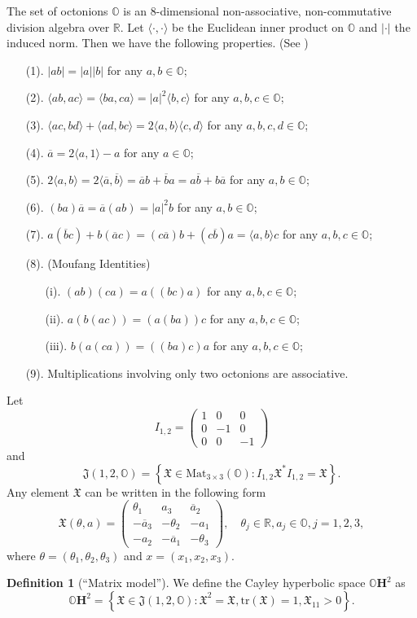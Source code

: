 \documentclass{article}
\newcommand{\OO}{\mathbb{O}}
\newcommand{\RR}{\mathbb{R}}
\newcommand{\tr}{\mathrm{tr}}
\newcommand{\FFJ}{\mathfrak{J}}
\newcommand{\FFX}{\mathfrak{X}}
\newcommand{\matiii}[3]{\left(\begin{array}{ccc} #1\\#2\\#3\end{array}\right)}
\theoremstyle{definition}
\newtheorem{dfn}[thm]{Definition}
\begin{document}
The set of octonions $\OO$ is an $8$-dimensional non-associative, non-commutative division algebra over $\RR$. Let $\langle\cdot,\cdot\rangle$ be the Euclidean inner product on $\OO$ and $|\cdot|$ the induced norm. Then we have the following properties. (See \cite{Springer00})
\begin{enumerate}
\item[(1).] $|ab|=|a||b|$ for any $a,b\in\OO$;
\item[(2).] $\langle ab,ac\rangle=\langle ba,ca\rangle=|a|^2\langle b,c\rangle$ for any $a,b,c\in \OO$;
\item[(3).] $\langle ac,bd\rangle+\langle ad,bc\rangle=2\langle a,b\rangle \langle c,d\rangle$ for any $a,b,c,d\in\OO$;
\item[(4).] $\overline{a}=2\langle a,1\rangle-a$ for any $a\in \OO$;
\item[(5).] $2\langle a,b\rangle=2\langle \overline{a},\overline{b}\rangle=\overline{a}b+\overline{b}a=a\overline{b}+b\overline{a}$ for any $a,b\in\OO$;
\item[(6).] $(ba)\overline{a}=\overline{a}(ab)=|a|^2b$ for any $a,b\in \OO$;
\item[(7).] $a(\overline{b}c)+b(\overline{a}c)=(c\overline{a})b+(c\overline{b})a=\langle a,b\rangle c$ for any $a,b,c\in\OO$;
\item[(8).] (Moufang Identities)
\begin{enumerate}
\item[(i).] $(ab)(ca)=a((bc)a)$ for any $a,b,c\in\OO$;
\item[(ii).] $a(b(ac))=(a(ba))c$ for any $a,b,c\in\OO$;
\item[(iii).] $b(a(ca))=((ba)c)a$ for any $a,b,c\in\OO$;
\end{enumerate}
\item[(9).] Multiplications involving only two octonions are associative.
\end{enumerate}
Let 
$$I_{1,2}=\matiii{1&0&0}{0&-1&0}{0&0&-1}$$
and 
$$\FFJ(1,2,\OO)=\left\{\FFX\in\mathrm{Mat}_{3\times 3}(\OO):I_{1,2}\FFX^*I_{1,2}=\FFX\right\}.$$
Any element $\FFX$ can be written in the following form
$$\FFX(\theta,a)=\matiii{\theta_1&a_3&\overline{a}_2}{-\overline{a}_3&-\theta_2&-a_1}{-a_2& -\overline{a}_1&-\theta_3},\quad \theta_j\in\RR, a_j\in\OO, j=1,2,3,$$
where $\theta=(\theta_1,\theta_2,\theta_3)$ and $x=(x_1,x_2,x_3)$.
\begin{dfn}[``Matrix model'']\label{matrix_model_OH^2}
We define the Cayley hyperbolic space $\OO\mathbf{H}^2$ as
$$\OO\mathbf{H}^2=\left\{\FFX\in\FFJ(1,2,\OO):\FFX^2=\FFX,\tr(\FFX)=1,\FFX_{11}>0 \right\}.$$
\end{dfn}
\end{document}
